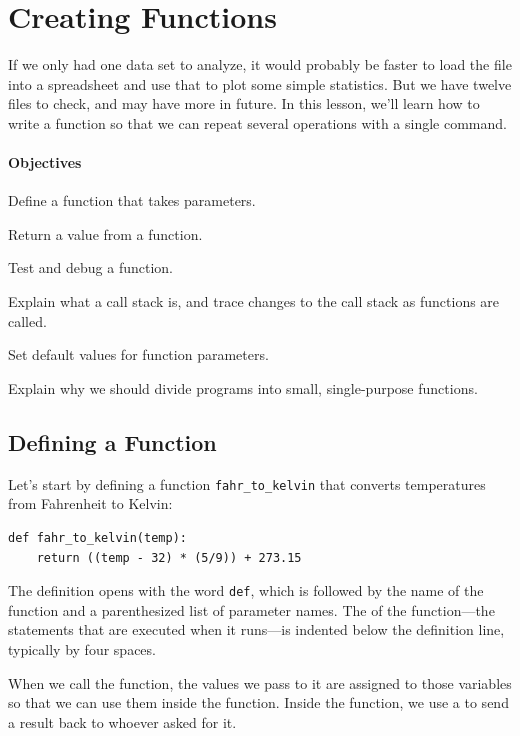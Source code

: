 \documentclass{book}
\begin{document}
\section{Creating Functions}

If we only had one data set to analyze, it would probably be faster to
load the file into a spreadsheet and use that to plot some simple
statistics. But we have twelve files to check, and may have more in
future. In this lesson, we'll learn how to write a function so that we
can repeat several operations with a single command.

\mbox{}\paragraph{Objectives}

\begin{swcitemize}
\item
  Define a function that takes parameters.
\item
  Return a value from a function.
\item
  Test and debug a function.
\item
  Explain what a call stack is, and trace changes to the call stack as
  functions are called.
\item
  Set default values for function parameters.
\item
  Explain why we should divide programs into small, single-purpose
  functions.
\end{swcitemize}

\subsection{Defining a Function}

Let's start by defining a function \texttt{fahr\_to\_kelvin} that
converts temperatures from Fahrenheit to Kelvin:

\begin{verbatim}
def fahr_to_kelvin(temp):
    return ((temp - 32) * (5/9)) + 273.15
\end{verbatim}

The definition opens with the word \texttt{def}, which is followed by
the name of the function and a parenthesized list of parameter names.
The  of the function---the statements
that are executed when it runs---is indented below the definition line,
typically by four spaces.

When we call the function, the values we pass to it are assigned to
those variables so that we can use them inside the function. Inside the
function, we use a  to
send a result back to whoever asked for it.
\end{document}
